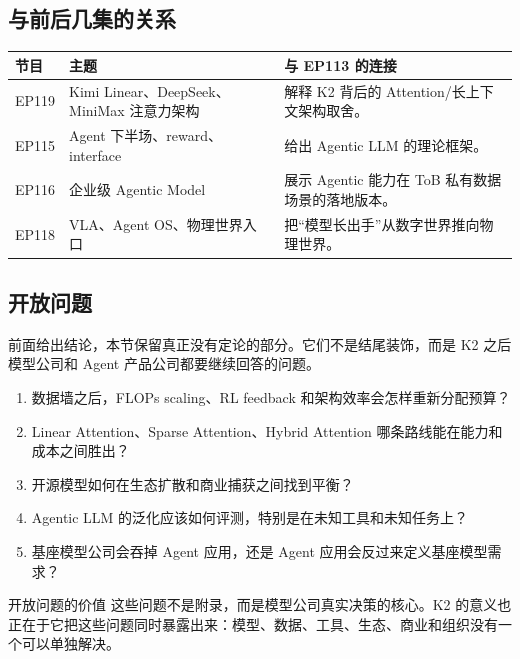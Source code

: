 \documentclass[a4paper]{article}
\begin{document}
\subsection{与前后几集的关系}

\begin{tabularx}{\textwidth}{p{}p{}X}
\toprule
节目 & 主题 & 与 EP113 的连接 \\
\midrule
EP119 & Kimi Linear、DeepSeek、MiniMax 注意力架构 & 解释 K2 背后的 Attention/长上下文架构取舍。 \\
EP115 & Agent 下半场、reward、interface & 给出 Agentic LLM 的理论框架。 \\
EP116 & 企业级 Agentic Model & 展示 Agentic 能力在 ToB 私有数据场景的落地版本。 \\
EP118 & VLA、Agent OS、物理世界入口 & 把“模型长出手”从数字世界推向物理世界。 \\
\bottomrule
\end{tabularx}

\subsection{开放问题}

前面给出结论，本节保留真正没有定论的部分。它们不是结尾装饰，而是 K2 之后模型公司和 Agent 产品公司都要继续回答的问题。

\begin{enumerate}
\item 数据墙之后，FLOPs scaling、RL feedback 和架构效率会怎样重新分配预算？
\item Linear Attention、Sparse Attention、Hybrid Attention 哪条路线能在能力和成本之间胜出？
\item 开源模型如何在生态扩散和商业捕获之间找到平衡？
\item Agentic LLM 的泛化应该如何评测，特别是在未知工具和未知任务上？
\item 基座模型公司会吞掉 Agent 应用，还是 Agent 应用会反过来定义基座模型需求？
\end{enumerate}

\begin{warningbox}{开放问题的价值}
这些问题不是附录，而是模型公司真实决策的核心。K2 的意义也正在于它把这些问题同时暴露出来：模型、数据、工具、生态、商业和组织没有一个可以单独解决。
\end{warningbox}
\end{document}
